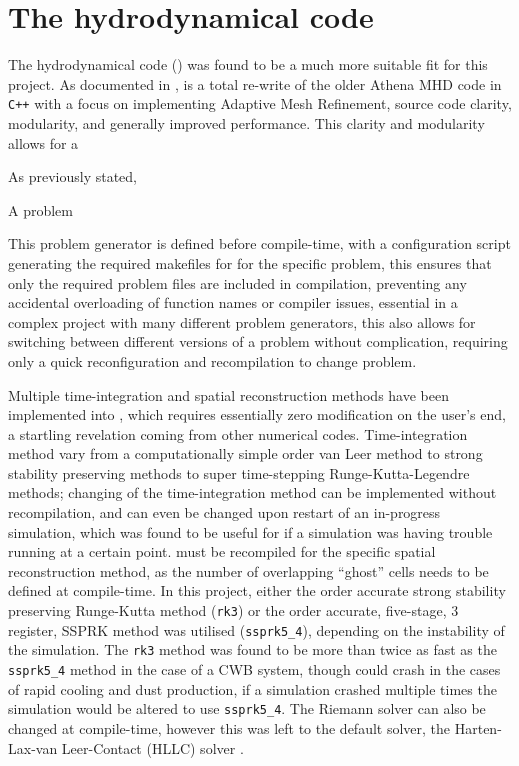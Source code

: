 \section{The \athena{} hydrodynamical code}
\label{sec:athenapp}

The \athena{} hydrodynamical code () was found to be a much more suitable fit for this project.
As documented in \textcite{stoneAthenaAdaptiveMesh2020}, \athena{} is a total re-write of the older Athena MHD code in \texttt{C++} with a focus on implementing Adaptive Mesh Refinement, source code clarity, modularity, and generally improved performance. 
This clarity and modularity allows for a 


As previously stated, 

A problem 

This problem generator is defined before compile-time, with a configuration script generating the required makefiles for \athena{} for the specific problem, this ensures that only the required problem files are included in compilation, preventing any accidental overloading of function names or compiler issues, essential in a complex project with many different problem generators, this also allows for switching between different versions of a problem without complication, requiring only a quick reconfiguration and recompilation to change problem. 

Multiple time-integration and spatial reconstruction methods have been implemented into \athena{}, which requires essentially zero modification on the user's end, a startling revelation coming from other numerical codes.
Time-integration method vary from a computationally simple  order van Leer \parencite{vanleerUltimateConservativeDifference1979} method to strong stability preserving methods \parencite{ruuthHighOrderStrongStabilityPreservingRungeKutta2005} to super time-stepping Runge-Kutta-Legendre \parencite{meyerStabilizedRungeKuttaLegendreMethod2014} methods;
changing of the time-integration method can be implemented without recompilation, and can even be changed upon restart of an in-progress simulation, which was found to be useful for if a simulation was having trouble running at a certain point.
\athena{} must be recompiled for the specific spatial reconstruction method, as the number of overlapping ``ghost'' cells needs to be defined at compile-time. 
In this project, either the  order accurate strong stability preserving Runge-Kutta method (\texttt{rk3}) or the  order accurate, five-stage, 3 register, SSPRK method was utilised (\texttt{ssprk5\_4}), depending on the instability of the simulation.
The \texttt{rk3} method was found to be more than twice as fast as the \texttt{ssprk5\_4} method in the case of a CWB system, though could crash in the cases of rapid cooling and dust production, if a simulation crashed multiple times the simulation would be altered to use \texttt{ssprk5\_4}. 
The Riemann solver can also be changed at compile-time, however this was left to the default solver, the Harten-Lax-van Leer-Contact (HLLC) solver \parencite{toroRestorationContactSurface1994}.

